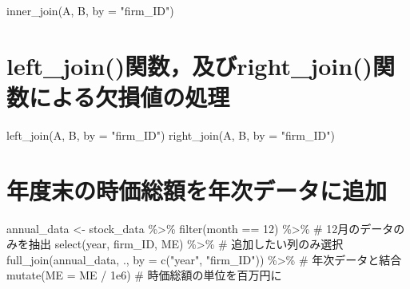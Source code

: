 \documentclass[
  letterpaper,
  DIV=11,
  numbers=noendperiod]{scrreprt}
\newenvironment{Shaded}{\begin{snugshade}}{\end{snugshade}}
\newcommand{\AttributeTok}[1]{\textcolor[rgb]{0.40,0.45,0.13}{#1}}
\newcommand{\CommentTok}[1]{\textcolor[rgb]{0.37,0.37,0.37}{#1}}
\newcommand{\DecValTok}[1]{\textcolor[rgb]{0.68,0.00,0.00}{#1}}
\newcommand{\FloatTok}[1]{\textcolor[rgb]{0.68,0.00,0.00}{#1}}
\newcommand{\FunctionTok}[1]{\textcolor[rgb]{0.28,0.35,0.67}{#1}}
\newcommand{\NormalTok}[1]{\textcolor[rgb]{0.00,0.23,0.31}{#1}}
\newcommand{\OtherTok}[1]{\textcolor[rgb]{0.00,0.23,0.31}{#1}}
\newcommand{\SpecialCharTok}[1]{\textcolor[rgb]{0.37,0.37,0.37}{#1}}
\newcommand{\StringTok}[1]{\textcolor[rgb]{0.13,0.47,0.30}{#1}}
\begin{document}
\begin{Shaded}
\begin{Highlighting}[]
\FunctionTok{inner\_join}\NormalTok{(A, B, }\AttributeTok{by =} \StringTok{"firm\_ID"}\NormalTok{)}
\end{Highlighting}
\end{Shaded}

\section{left\_join()関数，及びright\_join()関数による欠損値の処理}\label{left_joinux95a2ux6570ux53caux3073right_joinux95a2ux6570ux306bux3088ux308bux6b20ux640dux5024ux306eux51e6ux7406}

\begin{Shaded}
\begin{Highlighting}[]
\FunctionTok{left\_join}\NormalTok{(A, B, }\AttributeTok{by =} \StringTok{"firm\_ID"}\NormalTok{)}
\FunctionTok{right\_join}\NormalTok{(A, B, }\AttributeTok{by =} \StringTok{"firm\_ID"}\NormalTok{)}
\end{Highlighting}
\end{Shaded}

\section{年度末の時価総額を年次データに追加}\label{ux5e74ux5ea6ux672bux306eux6642ux4fa1ux7dcfux984dux3092ux5e74ux6b21ux30c7ux30fcux30bfux306bux8ffdux52a0}

\begin{Shaded}
\begin{Highlighting}[]
\NormalTok{annual\_data }\OtherTok{\textless{}{-}}\NormalTok{ stock\_data }\SpecialCharTok{\%\textgreater{}\%} 
  \FunctionTok{filter}\NormalTok{(month }\SpecialCharTok{==} \DecValTok{12}\NormalTok{) }\SpecialCharTok{\%\textgreater{}\%} \CommentTok{\# 12月のデータのみを抽出}
  \FunctionTok{select}\NormalTok{(year, firm\_ID, ME) }\SpecialCharTok{\%\textgreater{}\%} \CommentTok{\# 追加したい列のみ選択}
  \FunctionTok{full\_join}\NormalTok{(annual\_data, ., }\AttributeTok{by =} \FunctionTok{c}\NormalTok{(}\StringTok{"year"}\NormalTok{, }\StringTok{"firm\_ID"}\NormalTok{)) }\SpecialCharTok{\%\textgreater{}\%} \CommentTok{\# 年次データと結合}
  \FunctionTok{mutate}\NormalTok{(}\AttributeTok{ME =}\NormalTok{ ME }\SpecialCharTok{/} \FloatTok{1e6}\NormalTok{) }\CommentTok{\# 時価総額の単位を百万円に}
\end{Highlighting}
\end{Shaded}
\end{document}
